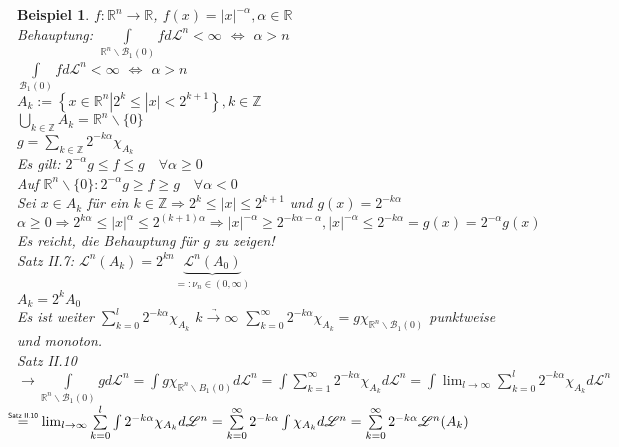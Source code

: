 \documentclass[11pt]{memoir}
\theoremstyle{changebreak}
\newtheorem{Beispiel}{Beispiel}[chapter]
\newcommand\overequal[1]{\mathrel{\overset{\makebox[0pt]{\mbox{\normalfont\tiny\sffamily $ #1 $}}}{=}}}
\begin{document}
\begin{Beispiel}
$f: \mathbb R^n \rightarrow \mathbb R$, $f(x) = |x|^{-\alpha}, \alpha \in \mathbb R$ \\
\emph{Behauptung:} $\int\limits_{\mathbb R^n\backslash \mathscr B_1(0)} f d\mathscr L^n < \infty$ $\Leftrightarrow$ $\alpha > n$ \\
$\int\limits_{\mathscr B_1(0)} f d\mathscr L^n < \infty$ $\Leftrightarrow$ $\alpha > n$ \\
$A_k := \left\{x \in \mathbb R^n | 2^k \leq |x| < 2^{k+1}\right\}, k \in \mathbb Z$ \\
$\bigcup\limits_{k \in \mathbb Z} A_k = \mathbb R^n\backslash\{0\}$ \\
$g = \sum\limits_{k \in \mathbb Z} 2^{-k\alpha}\chi_{A_k}$ \\
Es gilt: $2^{-\alpha}g \leq f \leq g\quad \forall \alpha \geq 0$ \\
Auf $\mathbb R^n\backslash\{0\}: 2^{-\alpha}g \geq f\geq g\quad \forall \alpha < 0$ \\
Sei $x \in A_k$ für ein $k \in \mathbb Z \Rightarrow 2^k \leq |x| \leq 2^{k+1}$ und $g(x) = 2^{-k\alpha}$ \\
$\alpha \geq 0 \Rightarrow 2^{k\alpha} \leq |x|^\alpha \leq 2^{(k+1)\alpha} \Rightarrow |x|^{-\alpha} \geq 2^{-k\alpha - \alpha}, |x|^{-\alpha} \leq 2^{-k\alpha} = g(x) = 2^{-\alpha} g(x)$ \\
Es reicht, die Behauptung für $g$ zu zeigen! \\
Satz II.7: $\mathscr L^n(A_k) = 2^{kn}\underbrace{\mathscr L^n(A_0)}_{=: \nu_n \in (0, \infty)}$ \\
$A_k = 2^k A_0$ \\
Es ist weiter $\sum\limits_{k=0}^l 2^{-k\alpha}\chi_{A_k}$ $\underrightarrow{k \rightarrow \infty}$ $\sum\limits_{k=0}^\infty 2^{-k\alpha}\chi_{A_k} = g\chi_{\mathbb R^n \backslash \mathscr B_1(0)}$ punktweise und monoton. \\
Satz II.10 \\
$\rightarrow \int\limits_{\mathbb R^n\backslash \mathscr B_1(0)} g d\mathscr L^n = \int g\chi_{\mathbb R^n\backslash B_1(0)} d\mathscr L^n = \int \sum\limits_{k=1}^\infty 2^{-k\alpha}\chi_{A_k} d\mathscr L^n = \int \lim_{l \rightarrow \infty} \sum\limits_{k=0}^l 2^{-k\alpha} \chi_{A_k} d\mathscr L^n$
$\overequal{\text{Satz II.10}} \, \, \, \, \lim_{l \rightarrow \infty} \sum\limits_{k=0}^l \int 2^{-k\alpha}\chi_{A_k} d\mathscr L^n = \sum\limits_{k=0}^\infty 2^{-k\alpha} \int \chi_{A_k} d\mathscr L^n = \sum\limits_{k=0}^\infty 2^{-k\alpha} \mathscr L^n (A_k)$ \\

\end{Beispiel}
\end{document}
